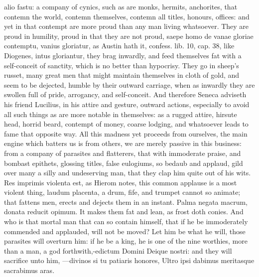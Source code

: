 {alio fastu: a company of cynics, such as are monks, hermits,
anchorites, that contemn the world, contemn themselves, contemn all
titles, honours, offices: and yet in that contempt are more proud than
any man living whatsoever. They are proud in humility, proud in that
they are not proud, saepe homo de vanae gloriae contemptu, vanius
gloriatur, as Austin hath it, confess. lib. 10, cap. 38, like Diogenes,
intus gloriantur, they brag inwardly, and feed themselves fat with a
self-conceit of sanctity, which is no better than hypocrisy. They go in
sheep's russet, many great men that might maintain themselves in cloth
of gold, and seem to be dejected, humble by their outward carriage,
when as inwardly they are swollen full of pride, arrogancy, and
self-conceit. And therefore Seneca adviseth his friend Lucilius,
in his attire and gesture, outward actions, especially to avoid
all such things as are more notable in themselves: as a rugged attire,
hirsute head, horrid beard, contempt of money, coarse lodging, and
whatsoever leads to fame that opposite way.
All this madness yet proceeds from ourselves, the main engine which
batters us is from others, we are merely passive in this business: from
a company of parasites and flatterers, that with immoderate praise, and
bombast epithets, glossing titles, false eulogiums, so bedaub and
applaud, gild over many a silly and undeserving man, that they clap him
quite out of his wits. Res imprimis violenta est, as Hierom notes, this
common applause is a most violent thing, laudum placenta, a drum, fife,
and trumpet cannot so animate; that fattens men, erects and dejects
them in an instant.  Palma negata macrum, donata reducit opimum.
It makes them fat and lean, as frost doth conies. And who is that
mortal man that can so contain himself, that if he be immoderately
commended and applauded, will not be moved? Let him be what he will,
those parasites will overturn him: if he be a king, he is one of the
nine worthies, more than a man, a god forthwith,-edictum Domini
Deique nostri: and they will sacrifice unto him,
---divinos si tu patiaris honores,
Ultro ipsi dabimus meritasque sacrabimus aras.

}
